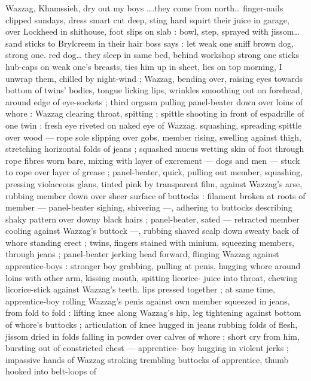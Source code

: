 Wazzag, Khamssieh, dry out my boys {\gr} {\ldots}.they come from north{\ldots} 
finger-nails clipped{\td} sundays, dress smart{\td} cut deep, sting hard{\td} 
squirt their juice in garage, over Lockheed{\td} in shithouse, foot slips 
on slab : bowl, step, sprayed with jissom{\ldots} sand sticks to Brylcreem 
in their hair{\td} boss says : {\gl}let weak one sniff brown dog, strong one. 
red dog{\gr}{\ldots} they sleep in same bed, behind workshop{\td} strong one 
sticks hub-caps on weak one's breasts, ties him up in sheet, lies on 
top{\td} morning, I unwrap them, chilled by night-wind{\td} {\gr} ; Wazzag, 
bending over, raising eyes towards bottom of twins' bodies, tongue 
licking lips, wrinkles smoothing out on forehead, around edge of 
eye-sockets ; third orgasm pulling panel-beater down over loins of 
whore : Wazzag clearing throat, spitting ; spittle shooting in front of 
espadrille of one twin : fresh eye riveted on naked eye of Wazzag. 
squashing, spreading spittle over wood --- rope sole slipping over 
gobs, member rising, swelling against thigh, stretching horizontal 
folds of jeans ; squashed mucus wetting skin of foot through rope 
fibres worn bare, mixing with layer of excrement --- dogs and men 
--- stuck to rope over layer of grease ; panel-beater, quick, pulling 
out member, squashing, pressing violaceous glans, tinted pink by 
transparent film, against Wazzag's arse, rubbing member down over 
sheer surface of buttocks : filament broken at roots of member --- 
panel-beater sighing, shivering ---, adhering to buttocks describing 
shaky pattern over downy black hairs ; panel-beater, sated --- 
retracted member cooling against Wazzag's buttock ---, rubbing 
shaved scalp down sweaty back of whore standing erect ; twins, 
fingers stained with minium, squeezing members, through jeans ; 
panel-beater jerking head forward, flinging Wazzag against 
apprentice-boys : stronger boy grabbing, pulling at penis, hugging 
whore around loins with other arm, kissing mouth, spitting licorice- 
juice into throat, chewing licorice-stick against Wazzag's teeth. lips 
pressed together ; at same time, apprentice-boy rolling Wazzag's 
penis against own member squeezed in jeans, from fold to fold : 
lifting knee along Wazzag's hip, leg tightening against bottom of 
whore's buttocks ; articulation of knee hugged in jeans rubbing folds 
of flesh, jissom dried in folds falling in powder over calves of whore 
; short cry from him, bursting out of constricted chest --- apprentice- 
boy hugging in violent jerks ; impassive hands of Wazzag stroking 
trembling buttocks of apprentice, thumb hooked into belt-loops of 
